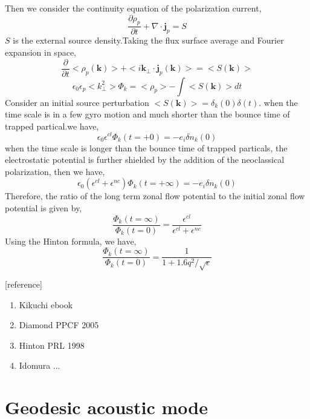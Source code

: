 \documentclass[11pt,a4paper]{article}
\begin{document}
	Then we consider the continuity equation of the polarization current,
	\begin{equation}
		\frac{\partial\rho_p}{\partial{t}}+\nabla\cdot\pmb{j}_p=S		
	\end{equation}
	$S$ is the external source density.Taking the flux surface average and Fourier expansion in space, 
	\begin{equation}
		\frac{\partial}{\partial{t}}<\rho_p(\pmb{k})>+<i\pmb{k}_\perp\cdot{\pmb{j}_p}(\pmb{k})>=<S(\pmb{k})>
	\end{equation}
	\begin{equation}
		\epsilon_0\epsilon_p<k_\perp^2>\Phi_k=<\rho_p>-\int<S(\pmb{k})>dt
	\end{equation}
	Consider an initial source perturbation $<S(\pmb{k})>=\delta_k(0)\delta(t)$. when the time scale is in a few gyro motion and much shorter than the bounce time of trapped partical.we have,
	\begin{equation}
		\epsilon_0\epsilon^{cl}\Phi_k(t=+0)=-e_i\delta{n_k(0)}
	\end{equation} 
	when the time scale is longer than the bounce time of trapped particals, the electrostatic potential is further shielded by the addition of the neoclassical polarization, then we have,
	\begin{equation}
		\epsilon_0(\epsilon^{cl}+\epsilon^{nc})\Phi_k(t=+\infty)=-e_i\delta{n_k(0)}
	\end{equation}
	Therefore, the ratio of the long term zonal flow potential to the initial zonal flow potential is given by, 
	\begin{equation}
		\frac{\Phi_k(t=\infty)}{\Phi_k(t=0)}=\frac{\epsilon^{cl}}{\epsilon^{cl}+\epsilon^{nc}}
	\end{equation}
	Using the Hinton formula, we have,
	\begin{equation}
		\frac{\Phi_k(t=\infty)}{\Phi_k(t=0)}=\frac{1}{1+1.6q^2/\sqrt{\epsilon}}
	\end{equation}
		
	
	[reference]
	\begin{enumerate}
		\item Kikuchi ebook
		\item Diamond PPCF 2005
		\item Hinton PRL 1998
		\item Idomura ... 
	\end{enumerate}
	
	
\newpage	
\section{Geodesic acoustic mode}
\end{document}
